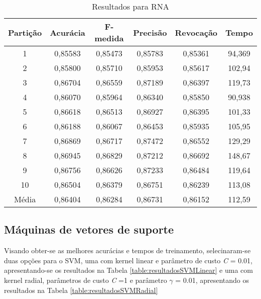 	
\begin{table}[h]
\centering
\caption{Resultados para RNA}
\vspace{0.2cm}
\begin{tabular}{c|c|c|c|c|c}
Partição & Acurácia & F-medida & Precisão & Revocação & Tempo \\
\hline
1  & 0,85583 & 0,85473 & 0,85783 & 0,85361 & 94,369 \\
2  & 0,85800 & 0,85710 & 0,85953 & 0,85617 & 102,94 \\
3  & 0,86704 & 0,86559 & 0,87189 & 0,86397 & 119,73 \\
4  & 0,86070 & 0,85964 & 0,86340 & 0,85850 & 90,938 \\
5  & 0,86618 & 0,86513 & 0,86927 & 0,86395 & 101,33 \\
6  & 0,86188 & 0,86067 & 0,86453 & 0,85935 & 105,95 \\
7  & 0,86869 & 0,86717 & 0,87472 & 0,86552 & 129,29 \\
8  & 0,86945 & 0,86829 & 0,87212 & 0,86692 & 148,67 \\
9  & 0,86756 & 0,86626 & 0,87233 & 0,86484 & 119,64 \\
10 & 0,86504 & 0,86379 & 0,86751 & 0,86239 & 113,08 \\
\hline
Média & 0,86404 & 0,86284 & 0,86731 & 0,86152 & 112,59 \\
\end{tabular} 
\label{table:resultadosRNA}
\end{table}

\subsection{Máquinas de vetores de suporte}

Visando obter-se as melhores acurácias e tempos de treinamento, selecinaram-se duas opções para o SVM, uma com kernel linear e parâmetro de custo \emph{C} = 0.01, apresentando-se os resultados na Tabela \ref{table:resultadosSVMLinear} e uma com kernel radial, parâmetros de custo \emph{C} =1 e parâmetro \(\gamma\) = 0.01, apresentando os resultados na Tabela \ref{table:resultadosSVMRadial}

